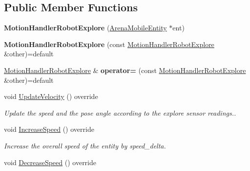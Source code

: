 \subsection*{Public Member Functions}
\begin{DoxyCompactItemize}
\item 
{\bfseries Motion\+Handler\+Robot\+Explore} (\hyperlink{class_arena_mobile_entity}{Arena\+Mobile\+Entity} $\ast$ent)\hypertarget{class_motion_handler_robot_explore_a5d62df9b7ffd800d4b35859ba1a72f3e}{}\label{class_motion_handler_robot_explore_a5d62df9b7ffd800d4b35859ba1a72f3e}

\item 
{\bfseries Motion\+Handler\+Robot\+Explore} (const \hyperlink{class_motion_handler_robot_explore}{Motion\+Handler\+Robot\+Explore} \&other)=default\hypertarget{class_motion_handler_robot_explore_ae82ba22271a4cf497d68f4bcd8c4b4e4}{}\label{class_motion_handler_robot_explore_ae82ba22271a4cf497d68f4bcd8c4b4e4}

\item 
\hyperlink{class_motion_handler_robot_explore}{Motion\+Handler\+Robot\+Explore} \& {\bfseries operator=} (const \hyperlink{class_motion_handler_robot_explore}{Motion\+Handler\+Robot\+Explore} \&other)=default\hypertarget{class_motion_handler_robot_explore_a4ee07340d788ea4fdc7de86b5f51da02}{}\label{class_motion_handler_robot_explore_a4ee07340d788ea4fdc7de86b5f51da02}

\item 
void \hyperlink{class_motion_handler_robot_explore_a88d0b13f1082475630d1955258aaa174}{Update\+Velocity} () override\hypertarget{class_motion_handler_robot_explore_a88d0b13f1082475630d1955258aaa174}{}\label{class_motion_handler_robot_explore_a88d0b13f1082475630d1955258aaa174}

\begin{DoxyCompactList}\small\item\em Update the speed and the pose angle according to the explore sensor readings.. \end{DoxyCompactList}\item 
void \hyperlink{class_motion_handler_robot_explore_aa52a668bd64c17b56dbd0be199cddc2c}{Increase\+Speed} () override\hypertarget{class_motion_handler_robot_explore_aa52a668bd64c17b56dbd0be199cddc2c}{}\label{class_motion_handler_robot_explore_aa52a668bd64c17b56dbd0be199cddc2c}

\begin{DoxyCompactList}\small\item\em Increase the overall speed of the entity by speed\+\_\+delta. \end{DoxyCompactList}\item 
void \hyperlink{class_motion_handler_robot_explore_a8898051b46761b8ba64468a3afa1bbca}{Decrease\+Speed} () override\hypertarget{class_motion_handler_robot_explore_a8898051b46761b8ba64468a3afa1bbca}{}\label{class_motion_handler_robot_explore_a8898051b46761b8ba64468a3afa1bbca}


\end{DoxyCompactItemize}
